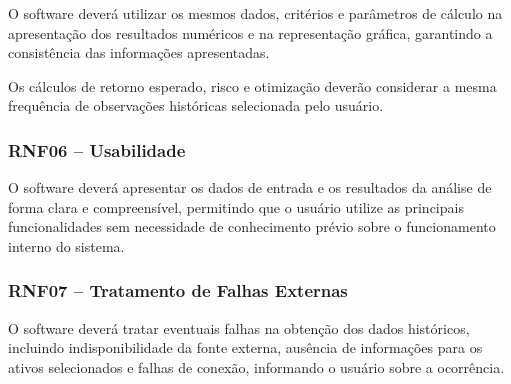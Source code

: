 O software deverá utilizar os mesmos dados, critérios e
parâmetros de cálculo na apresentação dos resultados
numéricos e na representação gráfica, garantindo a
consistência das informações apresentadas.

Os cálculos de retorno esperado, risco e otimização
deverão considerar a mesma frequência de observações
históricas selecionada pelo usuário.

\subsubsection{RNF06 -- Usabilidade}

O software deverá apresentar os dados de entrada e os
resultados da análise de forma clara e compreensível,
permitindo que o usuário utilize as principais
funcionalidades sem necessidade de conhecimento prévio
sobre o funcionamento interno do sistema.

\subsubsection{RNF07 -- Tratamento de Falhas Externas}

O software deverá tratar eventuais falhas na obtenção dos
dados históricos, incluindo indisponibilidade da fonte
externa, ausência de informações para os ativos selecionados
e falhas de conexão, informando o usuário sobre a ocorrência.


